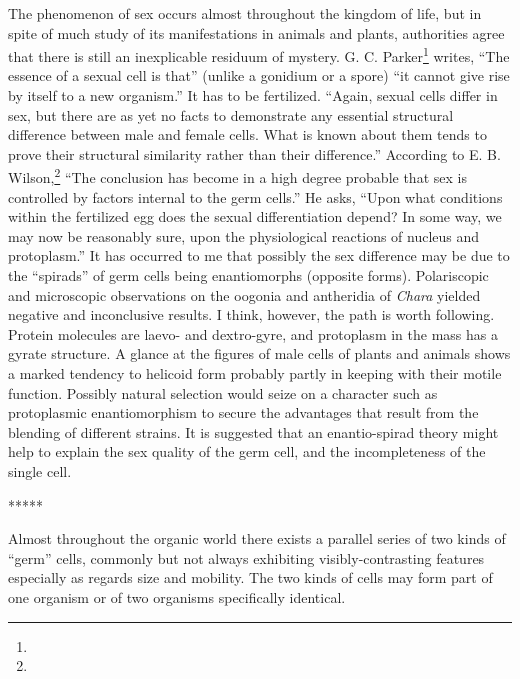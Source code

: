 \documentclass[a4paper, 12pt, oneside]{article}
\begin{document}
The phenomenon of sex occurs almost throughout the kingdom of life, but in spite of much study of its manifestations in animals and plants, authorities agree that there is still an inexplicable residuum of mystery. G. C. Parker\footnote{} writes, ``The essence of a sexual cell is that'' (unlike a gonidium or a spore) ``it cannot give rise by itself to a new organism.'' It has to be fertilized. ``Again, sexual cells differ in sex, but there are as yet no facts to demonstrate any essential structural difference between male and female cells. What is known about them tends to prove their structural similarity rather than their difference.'' According to E. B. Wilson,\footnote{} ``The conclusion has become in a high degree probable that sex is controlled by factors internal to the germ cells.'' He asks, ``Upon what conditions within the fertilized egg does the sexual differentiation depend? In some way, we may now be reasonably sure, upon the physiological reactions of nucleus and protoplasm.'' It has occurred to me that possibly the sex difference may be due to the ``spirads'' of germ cells being enantiomorphs (opposite forms). Polariscopic and microscopic observations on the oogonia and antheridia of \emph{Chara} yielded negative and inconclusive results. I think, however, the path is worth following. Protein molecules are laevo- and dextro-gyre, and protoplasm in the mass has a gyrate structure. A glance at the figures of male cells of plants and animals shows a marked tendency to helicoid form probably partly in keeping with their motile function. Possibly natural selection would seize on a character such as protoplasmic enantiomorphism to secure the advantages that result from the blending of different strains. It is suggested that an enantio-spirad theory might help to explain the sex quality of the germ cell, and the incompleteness of the single cell.

\centerline{*\hspace{15mm}*\hspace{15mm}*\hspace{15mm}*\hspace{15mm}*}
\bigskip

Almost throughout the organic world there exists a parallel series of two kinds of ``germ'' cells, commonly but not always exhibiting visibly-contrasting features especially as regards size and mobility. The two kinds of cells may form part of one organism or of two organisms specifically identical.
\end{document}

